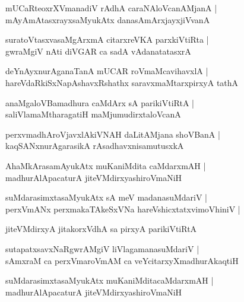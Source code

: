 \documentclass[twoside,12pt,openright]{book}
\newcounter{shloka}[chapter]
\begin{document}
\begin{shloka}%
mUCaRteoxrXVmanadiV rAdhA caraNAloVcanAMjanA |\\
mAyAmAtasxrayxsaMyukAtx danasAmArxjayxjiVvanA 
\end{shloka}

\begin{shloka}%
suratoVtasxvasaMgArxmA citarxreVKA parxkiVtiRta |\\
gwraMgiV nAti diVGAR ca sadA vAdanatatasxrA 
\end{shloka}

\begin{shloka}%
deYnAyxnurAganaTanA mUCAR roVmaMcavihavxlA |\\
hareVdaRkiSxNapAshavxRshathx saravxmaMtarxpirxyA tathA 
\end{shloka}

\begin{shloka}%
anaMgaloVBamadhura caMdArx sA parikiVtiRtA |\\
saliVlamaMtharagatiH maMjumudirxtaloVcanA 
\end{shloka}

\begin{shloka}%
perxvmadhAroVjavxlAkiVNAH daLitAMjana shoVBanA |\\
kaqSANxnurAgarasikA rAsadhavxnisamutusxkA
\end{shloka}

\begin{shloka}%
AhaMkArasamAyukAtx muKaniMdita caMdarxmAH |\\
madhurAlApacaturA jiteVMdirxyashiroVmaNiH
\end{shloka}

\begin{shloka}%
suMdarasimxtasaMyukAtx sA meV madanasuMdariV |\\
perxVmANx perxmakaTAkeSxVNa hareVshicxtatxvimoVhiniV |\\
\end{shloka}

\begin{shloka}%
jiteVMdirxyA jitakorxVdhA sa pirxyA parikiVtiRtA 
\end{shloka}

\begin{shloka}%
sutapatxsavxNaRgwrAMgiV liVlagamanasuMdariV |\\
sAmxraM ca perxVmaroVmAM ca veYcitarxyXmadhurAkaqtiH
\end{shloka}

\begin{shloka}%
suMdarasimxtasaMyukAtx muKaniMditacaMdarxmAH |\\
madhurAlApacaturA jiteVMdirxyashiroVmaNiH
\end{shloka}
\end{document}
